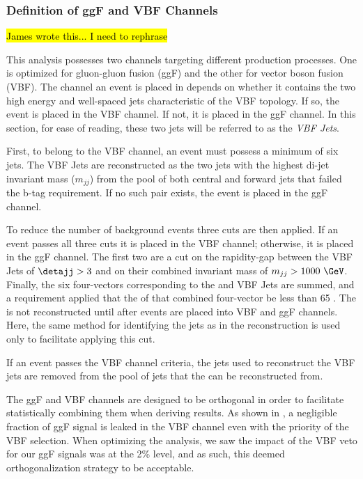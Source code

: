 \subsubsection{Definition of ggF and VBF Channels}

\hl{James wrote this... I need to rephrase}

This analysis possesses two channels targeting different \HH production processes. One is optimized for gluon-gluon fusion (ggF) and the other for vector boson fusion (VBF). The channel an event is placed in depends on whether it contains the two high energy and well-spaced jets characteristic of the VBF topology. If so, the event is placed in the VBF channel. If not, it is placed in the ggF channel. In this section, for ease of reading, these two jets will be referred to as the \textit{VBF Jets}.

First, to belong to the VBF channel, an event must possess a minimum of six jets. The VBF Jets are reconstructed as the two jets with the highest di-jet invariant mass ($m_{jj}$) from the pool of both central and forward jets that failed the b-tag requirement. If no such pair exists, the event is placed in the ggF channel.

To reduce the number of background events three cuts are then applied. If an event passes all three cuts it is placed in the VBF channel; otherwise, it is placed in the ggF channel. The first two are a cut on the rapidity-gap between the VBF Jets of $\detajj > 3$ and on their combined invariant mass of $m_{jj} > 1000\ \GeV$. Finally, the six four-vectors corresponding to the \HH and VBF Jets are summed, and a requirement applied that the \pt of that combined four-vector be less than 65 \GeV. The \HH is not reconstructed until after events are placed into VBF and ggF channels. Here, the same method for identifying the \HH jets as in the reconstruction is used only to facilitate applying this cut.

If an event passes the VBF channel criteria, the jets used to reconstruct the VBF jets are removed from the pool of jets that the \HH can be reconstructed from.

The ggF and VBF channels are designed to be orthogonal in order to facilitate statistically combining them when deriving results. 
As shown in \Sect{\ref{subsec:sigYields}} \Tab{\ref{tab:ggF_4SR_yields}}, a negligible fraction of ggF signal is leaked in the VBF channel even with the priority of the VBF selection. %
When optimizing the analysis, we saw the impact of the VBF veto for our ggF signals was at the 2\% level, and as such, this deemed orthogonalization strategy to be acceptable.
